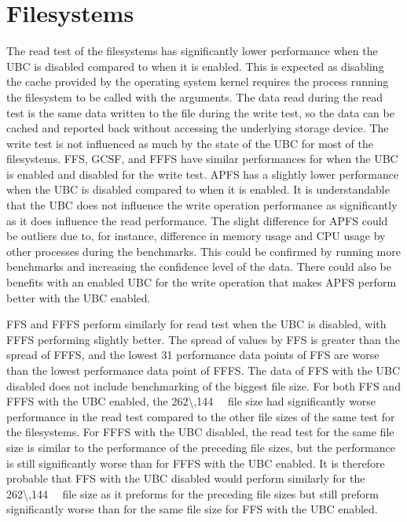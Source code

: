 \section{Filesystems}
\label{sec:dis_fs}

The read test of the filesystems has significantly lower performance when the \gls{UBC} is disabled compared to when it is enabled. This is expected as disabling the cache provided by the operating system kernel requires the process running the filesystem to be called with the arguments. The data read during the read test is the same data written to the file during the write test, so the data can be cached and reported back without accessing the underlying storage device. The write test is not influenced as much by the state of the \gls{UBC} for most of the filesystems. \gls{FFS}, \gls{GCSF}, and \gls{FFFS} have similar performances for when the \gls{UBC} is enabled and disabled for the write test. \gls{APFS} has a slightly lower performance when the \gls{UBC} is disabled compared to when it is enabled. It is understandable that the \gls{UBC} does not influence the write operation performance as significantly as it does influence the read performance. The slight difference for \gls{APFS} could be outliers due to, for instance, difference in memory usage and CPU usage by other processes during the benchmarks. This could be confirmed by running more benchmarks and increasing the confidence level of the data. There could also be benefits with an enabled \gls{UBC} for the write operation that makes \gls{APFS} perform better with the \gls{UBC} enabled.

\gls{FFS} and \gls{FFFS} perform similarly for read test when the \gls{UBC} is disabled, with \gls{FFFS} performing slightly better. The spread of values by \gls{FFS} is greater than the spread of \gls{FFFS}, and the lowest 31 performance data points of \gls{FFS} are worse than the lowest performance data point of \gls{FFFS}. The data of \gls{FFS} with the \gls{UBC} disabled does not include benchmarking of the biggest file size. For both \gls{FFS} and \gls{FFFS} with the \gls{UBC} enabled, the \SI{262\,144}{\kilo\byte} file size had significantly worse performance in the read test compared to the other file sizes of the same test for the filesystems. For \gls{FFFS} with the \gls{UBC} disabled, the read test for the same file size is similar to the performance of the preceding file sizes, but the performance is still significantly worse than for \gls{FFFS} with the \gls{UBC} enabled. It is therefore probable that \gls{FFS} with the \gls{UBC} disabled would perform similarly for the \SI{262\,144}{\kilo\byte} file size as it preforms for the preceding file sizes but still preform significantly worse than for the same file size for \gls{FFS} with the \gls{UBC} enabled.




